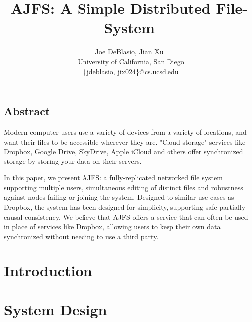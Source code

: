 \documentclass[letterpaper,twocolumn,10pt]{article}
\begin{document}
\date{}

\title{\Large \bf AJFS: A Simple Distributed File-System}

\author{
    {\rm Joe DeBlasio, Jian Xu}\\\
    University of California, San Diego\\\
    \{jdeblasio, jix024\}@cs.ucsd.edu}

\maketitle

\thispagestyle{empty}

\subsection*{Abstract}
    Modern computer users use a variety of devices from a variety of locations,
and want their files to be accessible wherever they are. "Cloud storage"
services like Dropbox, Google Drive, SkyDrive, Apple iCloud and others offer
synchronized storage by storing your data on their servers.

    In this paper, we present AJFS: a fully-replicated networked file system
supporting multiple users, simultaneous editing of distinct files and robustness
against nodes failing or joining the system. Designed to similar use cases as
Dropbox, the system has been designed for simplicity, supporting safe
partially-causal consistency. We believe that AJFS offers a service that can
often be used in place of services like Dropbox, allowing users to keep their
own data synchronized without needing to use a third party.

\section{Introduction}
\label{sec:introduction}


\section{System Design}
\label{sec:designOverview}


%    
\end{document}
